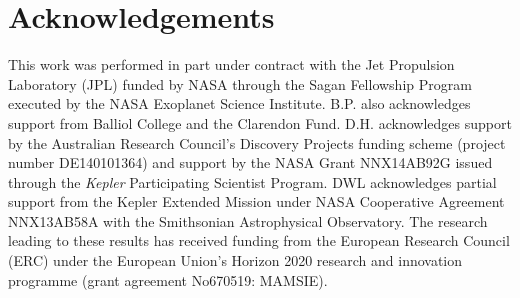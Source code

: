 \documentclass[a4paper,fleqn,usenatbib]{mnras}
\begin{document}
%



\section*{Acknowledgements} %

This work was performed in part under contract with the Jet Propulsion Laboratory (JPL) funded by NASA through the Sagan Fellowship Program executed by the NASA Exoplanet Science Institute. B.P. also acknowledges support from Balliol College and the Clarendon Fund. D.H. acknowledges support by the Australian Research Council's Discovery Projects funding scheme (project number DE140101364) and support by the NASA Grant NNX14AB92G issued through the \emph{Kepler} Participating Scientist Program. DWL acknowledges partial support from the Kepler Extended Mission under NASA Cooperative Agreement NNX13AB58A with the Smithsonian Astrophysical Observatory. The research leading to these results has received funding from the European Research Council (ERC) under the European Union's Horizon 2020 research and innovation programme (grant agreement No670519: MAMSIE).
\end{document}
